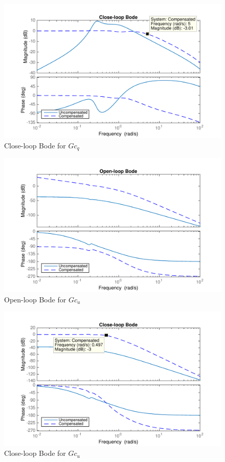 \documentclass[12pt]{article}
\begin{document}
\begin{figure}[h!]
\begin{center}
\includegraphics[width=.95\textwidth]{figures/closeloop_gc1}
\caption{Close-loop Bode for $Gc_q$}
\end{center}
\end{figure}

\begin{figure}[h!]
\begin{center}
\includegraphics[width=.95\textwidth]{figures/openloop_gc2}
\caption{Open-loop Bode for $Gc_u$}
\end{center}
\end{figure}

\begin{figure}[h!]
\begin{center}
\includegraphics[width=.95\textwidth]{figures/closeloop_gc2}
\caption{Close-loop Bode for $Gc_u$}
\end{center}
\end{figure}
\end{document}
